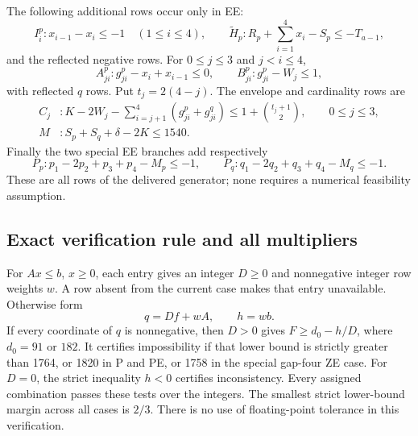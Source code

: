 \documentclass[11pt,a4paper]{article}
\theoremstyle{remark}
\begin{document}
The following additional rows occur only in EE:
\[
 I_i^p:x_{i-1}-x_i\leq-1\quad(1\leq i\leq4),\qquad
 \widetilde H_p:R_p+\sum_{i=1}^4x_i-S_p\leq-T_{a-1},
\]
and the reflected negative rows. For $0\leq j\leq3$ and $j<i\leq4$,
\[
 A^p_{ji}:g^p_{ji}-x_i+x_{i-1}\leq0,\qquad
 B^p_{ji}:g^p_{ji}-W_j\leq1,
\]
with reflected $q$ rows. Put $t_j=2(4-j)$. The envelope and cardinality
rows are
\[
\begin{split}
 C_j &: K-2W_j-\sum_{i=j+1}^4(g^p_{ji}+g^q_{ji})
              \leq1+\binom{t_j+1}{2},\qquad 0\leq j\leq3,\\
 M &: S_p+S_q+\delta-2K\leq1540.
\end{split}
\]
Finally the two special EE branches add respectively
\[
 P_p:p_1-2p_2+p_3+p_4-M_p\leq-1,\qquad
 P_q:q_1-2q_2+q_3+q_4-M_q\leq-1.
\]
These are all rows of the delivered generator; none requires a numerical
feasibility assumption.

\subsection{Exact verification rule and all multipliers}
For $Ax\leq b$, $x\geq0$, each entry gives an integer $D\geq0$ and
nonnegative integer row weights $w$. A row absent from the current case
makes that entry unavailable. Otherwise form
\[
 q=Df+wA,\qquad h=wb.
\]
If every coordinate of $q$ is nonnegative, then $D>0$ gives
$F\geq d_0-h/D$, where $d_0=91$ or $182$.
It certifies impossibility if that lower bound is strictly greater than
1764, or 1820 in P and PE, or 1758 in the special gap-four ZE case.
For $D=0$, the strict inequality $h<0$ certifies inconsistency.
Every assigned combination passes these tests over the integers.
The smallest strict lower-bound margin across all cases is $2/3$.
There is no use of floating-point tolerance in this verification.
\end{document}
